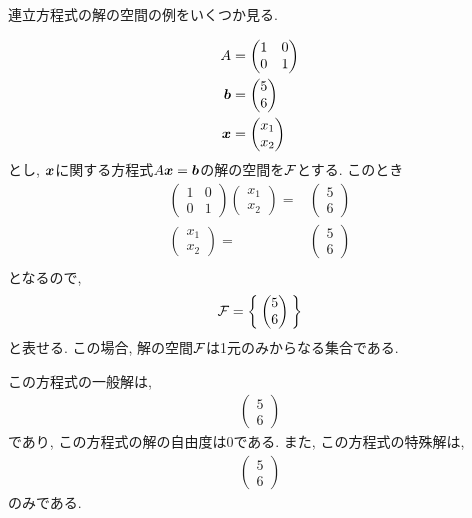 連立方程式の解の空間の例をいくつか見る.
\begin{example}
  \begin{align*}
    A&=\begin{pmatrix}1&0\\0&1\end{pmatrix}\\
    \boldsymbol{b}&=\begin{pmatrix}5\\6\end{pmatrix}\\
    \boldsymbol{x}&=\begin{pmatrix}x_1\\x_2\end{pmatrix}
  \end{align*}
  とし,
  $\boldsymbol{x}$に関する方程式$A\boldsymbol{x}=\boldsymbol{b}$の解の空間を$\mathcal{F}$とする.
  このとき
  \begin{align*}
    \begin{pmatrix}1&0\\0&1\end{pmatrix}
      \begin{pmatrix}x_1\\x_2\end{pmatrix}=&
        \begin{pmatrix}5\\6\end{pmatrix}\\
          \begin{pmatrix}x_1\\x_2\end{pmatrix}=&
            \begin{pmatrix}5\\6\end{pmatrix}\\
  \end{align*}
  となるので,
  \begin{align*}
    \mathcal{F}=\Set{\begin{pmatrix}5\\6\end{pmatrix}}
  \end{align*}
  と表せる.
  この場合, 解の空間$\mathcal{F}$は1元のみからなる集合である.

  この方程式の一般解は,
  \begin{align*}
    \begin{pmatrix}5\\6\end{pmatrix}
  \end{align*}
  であり, この方程式の解の自由度は$0$である.
  また, この方程式の特殊解は,
  \begin{align*}
    \begin{pmatrix}5\\6\end{pmatrix}
  \end{align*}
  のみである.
\end{example}

